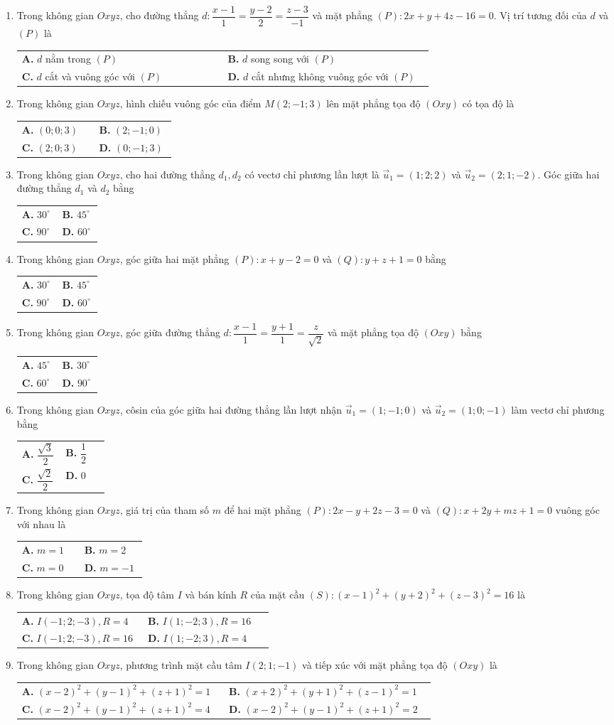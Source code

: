 \documentclass[12pt,a4paper]{article}
\makeatletter
\newcommand{\bonpa}[4]{\par\nobreak\smallskip\nobreak\noindent
\begin{tabular}{@{}p{0.48\linewidth}p{0.48\linewidth}@{}}
\textbf{A.} #1 & \textbf{B.} #2\\[8pt]
\textbf{C.} #3 & \textbf{D.} #4\end{tabular}}
\makeatother
\begin{document}
\begin{enumerate}
\item Trong không gian $Oxyz$, cho đường thẳng $d: \dfrac{x-1}{1} = \dfrac{y-2}{2} = \dfrac{z-3}{-1}$ và mặt phẳng $(P): 2x + y + 4z - 16 = 0$. Vị trí tương đối của $d$ và $(P)$ là
\bonpa{$d$ nằm trong $(P)$}{$d$ song song với $(P)$}{$d$ cắt và vuông góc với $(P)$}{$d$ cắt nhưng không vuông góc với $(P)$}

\item Trong không gian $Oxyz$, hình chiếu vuông góc của điểm $M(2; -1; 3)$ lên mặt phẳng tọa độ $(Oxy)$ có tọa độ là
\bonpa{$(0; 0; 3)$}{$(2; -1; 0)$}{$(2; 0; 3)$}{$(0; -1; 3)$}

\item Trong không gian $Oxyz$, cho hai đường thẳng $d_1, d_2$ có vectơ chỉ phương lần lượt là $\vec{u}_1 = (1; 2; 2)$ và $\vec{u}_2 = (2; 1; -2)$. Góc giữa hai đường thẳng $d_1$ và $d_2$ bằng
\bonpa{$30^\circ$}{$45^\circ$}{$90^\circ$}{$60^\circ$}

\item Trong không gian $Oxyz$, góc giữa hai mặt phẳng $(P): x + y - 2 = 0$ và $(Q): y + z + 1 = 0$ bằng
\bonpa{$30^\circ$}{$45^\circ$}{$90^\circ$}{$60^\circ$}

\item Trong không gian $Oxyz$, góc giữa đường thẳng $d: \dfrac{x-1}{1} = \dfrac{y+1}{1} = \dfrac{z}{\sqrt{2}}$ và mặt phẳng tọa độ $(Oxy)$ bằng
\bonpa{$45^\circ$}{$30^\circ$}{$60^\circ$}{$90^\circ$}

\item Trong không gian $Oxyz$, côsin của góc giữa hai đường thẳng lần lượt nhận $\vec{u}_1 = (1; -1; 0)$ và $\vec{u}_2 = (1; 0; -1)$ làm vectơ chỉ phương bằng
\bonpa{$\dfrac{\sqrt{3}}{2}$}{$\dfrac{1}{2}$}{$\dfrac{\sqrt{2}}{2}$}{$0$}

\item Trong không gian $Oxyz$, giá trị của tham số $m$ để hai mặt phẳng $(P): 2x - y + 2z - 3 = 0$ và $(Q): x + 2y + mz + 1 = 0$ vuông góc với nhau là
\bonpa{$m = 1$}{$m = 2$}{$m = 0$}{$m = -1$}

\item Trong không gian $Oxyz$, tọa độ tâm $I$ và bán kính $R$ của mặt cầu $(S): (x-1)^2 + (y+2)^2 + (z-3)^2 = 16$ là
\bonpa{$I(-1; 2; -3), R = 4$}{$I(1; -2; 3), R = 16$}{$I(-1; 2; -3), R = 16$}{$I(1; -2; 3), R = 4$}

\item Trong không gian $Oxyz$, phương trình mặt cầu tâm $I(2; 1; -1)$ và tiếp xúc với mặt phẳng tọa độ $(Oxy)$ là
\bonpa{$(x-2)^2 + (y-1)^2 + (z+1)^2 = 1$}{$(x+2)^2 + (y+1)^2 + (z-1)^2 = 1$}{$(x-2)^2 + (y-1)^2 + (z+1)^2 = 4$}{$(x-2)^2 + (y-1)^2 + (z+1)^2 = 2$}


\end{enumerate}
\end{document}

